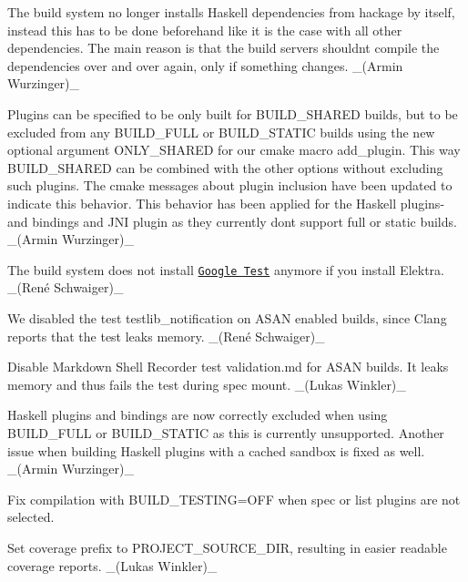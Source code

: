 \begin{DoxyItemize}
\item The build system no longer installs Haskell dependencies from hackage by itself, instead this has to be done beforehand like it is the case with all other dependencies. The main reason is that the build servers shouldn\textquotesingle{}t compile the dependencies over and over again, only if something changes. \+\_\+(\+Armin Wurzinger)\+\_\+
\item Plugins can be specified to be only built for {\ttfamily B\+U\+I\+L\+D\+\_\+\+S\+H\+A\+R\+ED} builds, but to be excluded from any {\ttfamily B\+U\+I\+L\+D\+\_\+\+F\+U\+LL} or {\ttfamily B\+U\+I\+L\+D\+\_\+\+S\+T\+A\+T\+IC} builds using the new optional argument {\ttfamily O\+N\+L\+Y\+\_\+\+S\+H\+A\+R\+ED} for our cmake macro {\ttfamily add\+\_\+plugin}. This way {\ttfamily B\+U\+I\+L\+D\+\_\+\+S\+H\+A\+R\+ED} can be combined with the other options without excluding such plugins. The cmake messages about plugin inclusion have been updated to indicate this behavior. This behavior has been applied for the Haskell plugins-\/ and bindings and J\+NI plugin as they currently don\textquotesingle{}t support full or static builds. \+\_\+(\+Armin Wurzinger)\+\_\+
\item The build system does not install \href{https://github.com/google/googletest}{\tt Google Test} anymore if you install Elektra. \+\_\+(René Schwaiger)\+\_\+
\item We disabled the test {\ttfamily testlib\+\_\+notification} on A\+S\+AN enabled builds, since Clang reports that the test leaks memory. \+\_\+(René Schwaiger)\+\_\+
\item Disable Markdown Shell Recorder test {\ttfamily validation.\+md} for A\+S\+AN builds. It leaks memory and thus fails the test during spec mount. \+\_\+(\+Lukas Winkler)\+\_\+
\item Haskell plugins and bindings are now correctly excluded when using {\ttfamily B\+U\+I\+L\+D\+\_\+\+F\+U\+LL} or {\ttfamily B\+U\+I\+L\+D\+\_\+\+S\+T\+A\+T\+IC} as this is currently unsupported. Another issue when building Haskell plugins with a cached sandbox is fixed as well. \+\_\+(\+Armin Wurzinger)\+\_\+
\item Fix compilation with {\ttfamily B\+U\+I\+L\+D\+\_\+\+T\+E\+S\+T\+I\+NG=O\+FF} when {\ttfamily spec} or {\ttfamily list} plugins are not selected.
\item Set coverage prefix to {\ttfamily P\+R\+O\+J\+E\+C\+T\+\_\+\+S\+O\+U\+R\+C\+E\+\_\+\+D\+IR}, resulting in easier readable coverage reports. \+\_\+(\+Lukas Winkler)\+\_\+

\end{DoxyItemize}
